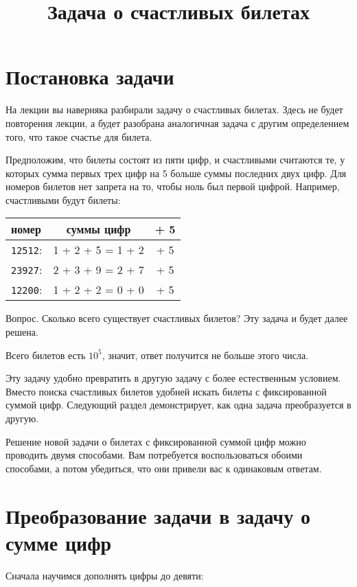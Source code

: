 \documentclass{article}
\title{Задача о счастливых билетах}
\author{}
\date{}
\begin{document}
\maketitle

\section{Постановка задачи}
На лекции вы наверняка разбирали задачу о счастливых билетах. Здесь не будет повторения лекции, а будет разобрана аналогичная задача с другим определением того, что такое счастье для билета.

Предположим, что билеты состоят из пяти цифр, и счастливыми считаются те, у которых сумма первых трех цифр на 5 больше суммы последних двух цифр. Для номеров билетов нет запрета на то, чтобы ноль был первой цифрой. Например, счастливыми будут билеты:

\begin{tabular}{lcc}
	номер&суммы цифр&+ 5\\
	\hline
	\verb|12512|:&1 + 2 + 5 = 1 + 2& + 5 \\
	\verb|23927|:&2 + 3 + 9 = 2 + 7& + 5 \\
	\verb|12200|:&1 + 2 + 2 = 0 + 0& + 5
\end{tabular}

Вопрос. Сколько всего существует счастливых билетов? Эту задача и будет далее решена.

Всего билетов есть $10^5$, значит, ответ получится не больше этого числа.

Эту задачу удобно превратить в другую задачу с более естественным условием. Вместо поиска счастливых билетов удобней искать билеты с фиксированной суммой цифр. Следующий раздел демонстрирует, как одна задача преобразуется в другую.

Решение новой задачи о билетах с фиксированной суммой цифр можно проводить двумя способами. Вам потребуется воспользоваться обоими способами, а потом убедиться, что они привели вас к одинаковым ответам.

\section{Преобразование задачи в задачу о сумме цифр}
Сначала научимся дополнять цифры до девяти:
\end{document}
